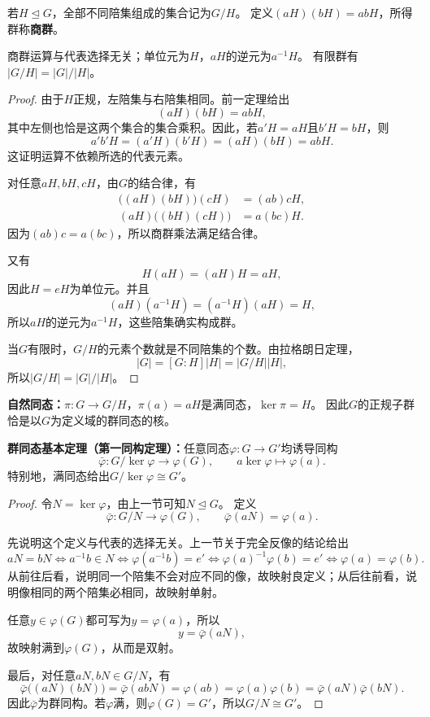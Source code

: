 \begin{definition}
\label{p2:concept:c1-l681}若$H\trianglelefteq G$，全部不同陪集组成的集合记为$G/H$。
定义$(aH)(bH)=abH$，所得群称\textbf{商群}。
\end{definition}

\begin{proposition}
商群运算与代表选择无关；单位元为$H$，$aH$的逆元为$a^{-1}H$。
有限群有$|G/H|=|G|/|H|$。
\end{proposition}
\begin{proof}
由于$H$正规，左陪集与右陪集相同。前一定理给出
\[
(aH)(bH)=abH,
\]
其中左侧也恰是这两个集合的集合乘积。因此，若$a'H=aH$且$b'H=bH$，则
\[
a'b'H=(a'H)(b'H)=(aH)(bH)=abH.
\]
这证明运算不依赖所选的代表元素。

对任意$aH,bH,cH$，由$G$的结合律，有
\[
\begin{aligned}
\bigl((aH)(bH)\bigr)(cH)&=(ab)cH,\\
(aH)\bigl((bH)(cH)\bigr)&=a(bc)H.
\end{aligned}
\]
因为$(ab)c=a(bc)$，所以商群乘法满足结合律。

又有
\[
H(aH)=(aH)H=aH,
\]
因此$H=eH$为单位元。并且
\[
(aH)(a^{-1}H)=(a^{-1}H)(aH)=H,
\]
所以$aH$的逆元为$a^{-1}H$，这些陪集确实构成群。

当$G$有限时，$G/H$的元素个数就是不同陪集的个数。由拉格朗日定理，
\[
|G|=[G:H]|H|=|G/H||H|,
\]
所以$|G/H|=|G|/|H|$。
\end{proof}

\begin{definition}
\label{p2:concept:c1-l727}\textbf{自然同态：}$\pi:G\to G/H$，$\pi(a)=aH$是满同态，$\ker\pi=H$。
因此$G$的正规子群恰是以$G$为定义域的群同态的核。
\end{definition}
\begin{theorem}\label{p2:group-first-iso}
\textbf{群同态基本定理（第一同构定理）：}任意同态$\varphi:G\to G'$均诱导同构
\[
\bar\varphi:G/\ker\varphi\longrightarrow\varphi(G),\qquad
a\ker\varphi\longmapsto\varphi(a).
\]
特别地，满同态给出$G/\ker\varphi\cong G'$。
\end{theorem}
\begin{proof}
令$N=\ker\varphi$，由上一节可知$N\trianglelefteq G$。
定义
\[
\bar\varphi:G/N\longrightarrow\varphi(G),\qquad
\bar\varphi(aN)=\varphi(a).
\]

先说明这个定义与代表的选择无关。上一节关于完全反像的结论给出
\[aN=bN\iff a^{-1}b\in N\iff\varphi(a^{-1}b)=e'\iff\varphi(a)^{-1}\varphi(b)=e'\iff\varphi(a)=\varphi(b).\]
从前往后看，说明同一个陪集不会对应不同的像，故映射良定义；从后往前看，说明像相同的两个陪集必相同，故映射单射。

任意$y\in\varphi(G)$都可写为$y=\varphi(a)$，所以
\[
y=\bar\varphi(aN),
\]
故映射满到$\varphi(G)$，从而是双射。

最后，对任意$aN,bN\in G/N$，有
\[\bar\varphi\bigl((aN)(bN)\bigr)=\bar\varphi(abN)=\varphi(ab)=\varphi(a)\varphi(b)=\bar\varphi(aN)\bar\varphi(bN).\]
因此$\bar\varphi$为群同构。若$\varphi$满，则$\varphi(G)=G'$，所以$G/N\cong G'$。
\end{proof}

